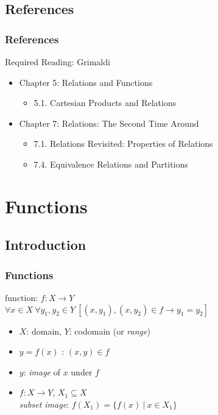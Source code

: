 \documentclass[dvipsnames]{beamer}
\begin{document}
\subsection*{References}

\begin{frame}
  \frametitle{References}

  \begin{block}{Required Reading: Grimaldi}
    \begin{itemize}
      \item Chapter 5: Relations and Functions
      \begin{itemize}
        \item 5.1. \alert{Cartesian Products and Relations}
      \end{itemize}
      \item Chapter 7: Relations: The Second Time Around
      \begin{itemize}
        \item 7.1. \alert{Relations Revisited: Properties of Relations}
        \item 7.4. \alert{Equivalence Relations and Partitions}
      \end{itemize}
    \end{itemize}
  \end{block}
\end{frame}

\section{Functions}

\subsection{Introduction}

\begin{frame}
  \frametitle{Functions}

  \begin{definition}
    \alert{function}: $f: X \rightarrow Y$\\
    $\forall x \in X~\forall y_1,y_2 \in Y~
      [(x,y_1),(x,y_2) \in f \rightarrow y_1=y_2]$
  \end{definition}

  \medskip
  \begin{itemize}
    \item $X$: \alert{domain}, $Y$: \alert{codomain} (or \emph{range})

    \pause
    \medskip
    \item $y = f(x)$ \hspace{1em} : \hspace{1em} $(x,y) \in f$
    \item $y$: \emph{image} of $x$ under $f$

    \pause
    \medskip
    \item $f: X \rightarrow Y$, $X_1 \subseteq X$\\
      \emph{subset image}: $f(X_1) = \{f(x)~|~x \in X_1\}$
 \end{itemize}
\end{frame}
\end{document}
